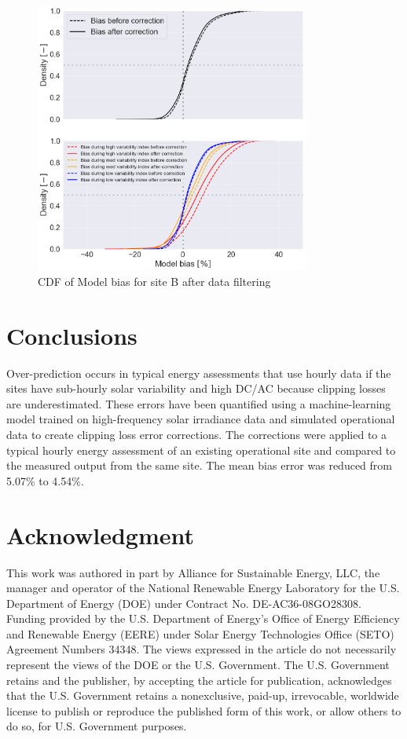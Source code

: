 \documentclass[conference]{IEEEtran}
\begin{document}
\begin{figure}[htbp]
\centerline{\includegraphics[width=9cm]{PAW_ModelBias_breakdown_AFTER_filter_CDF_v3.png}}
\caption{CDF of Model bias for site B after data filtering}
\label{fig:PAW-modelbias-after-filter-cdf}
\end{figure}

\section{Conclusions}
Over-prediction occurs in typical energy assessments that use hourly data if the sites have sub-hourly solar variability and high DC/AC because clipping losses are underestimated. These errors have been quantified using a machine-learning model trained on high-frequency solar irradiance data and simulated operational data to create clipping loss error corrections. The corrections were applied to a typical hourly energy assessment of an existing operational site and compared to the measured output from the same site. The mean bias error was reduced from 5.07\% to 4.54\%. 

\section*{Acknowledgment}

This work was authored in part by Alliance for Sustainable Energy, LLC, the manager and operator of the National Renewable Energy Laboratory for the U.S. Department of Energy (DOE) under Contract No. DE-AC36-08GO28308. Funding provided by the U.S. Department of Energy’s Office of Energy Efficiency and Renewable Energy (EERE) under Solar Energy Technologies Office (SETO) Agreement Numbers 34348. The views expressed in the article do not necessarily represent the views of the DOE or the U.S. Government. The U.S. Government retains and the publisher, by accepting the article for publication, acknowledges that the U.S. Government retains a nonexclusive, paid-up, irrevocable, worldwide license to publish or reproduce the published form of this work, or allow others to do so, for U.S. Government purposes.



\end{document}

